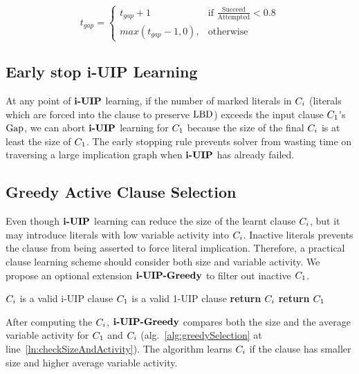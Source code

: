 \[
    t_{gap}=
\begin{cases}
    t_{gap} + 1& \text{if } \frac{\text{Succeed}}{\text{Attempted}} < 0.8\\
    max(t_{gap} - 1, 0),              & \text{otherwise}
\end{cases}
\]

\subsection{Early stop i-UIP Learning}
At any point of $\textbf{i-UIP}$ learning, if the number of marked literals in $C_{i}$ (literals which are forced into the clause to preserve $\text{LBD}$) exceeds the input clause $C_{1}$'s $\text{Gap}$, we can abort $\textbf{i-UIP}$ learning for $C_{1}$ because the size of the final $C_{i}$ is at least the size of $C_{1}$. The early stopping rule prevents solver from wasting time on traversing a large implication graph when $\textbf{i-UIP}$ has already failed.

\subsection{Greedy Active Clause Selection} \label{sec:greedy}
Even though $\textbf{i-UIP}$ learning can reduce the size of the learnt clause $C_{i}$, but it may introduce literals with low variable activity into $C_{i}$.  Inactive literals prevents the clause from being asserted to force literal implication. Therefore, a practical clause learning scheme should consider both size and variable activity. We propose an optional extension $\IUIPGreedy$ to filter out inactive $C_{1}$.  

\begin{algorithm}[t]
\caption{$\IUIPGreedy$}\label{alg:greedySelection}
\begin{algorithmic}[1]
\Require  $C_{i}$ is a valid i-UIP clause
\Require  $C_{1}$ is a valid 1-UIP clause
\Procedure{$\IUIPGreedy$}{$\iUIPClause, \oneUIPClause$} 
    \label{ln:checkSizeAndActivity}
    \State \textbf{return} $C_{i}$
\Else
    \State \textbf{return} $C_{1}$
\EndIf  \label{ln:cSizeCheck}
\EndProcedure
\end{algorithmic}
\end{algorithm}

After computing the $C_{i}$, $\IUIPGreedy$ compares both the size and the average variable activity for $C_{1}$ and $C_{i}$ (alg.~\ref{alg:greedySelection} at line~\ref{ln:checkSizeAndActivity}). The algorithm learns $C_{i}$ if the clause has smaller size and higher average variable activity. 

